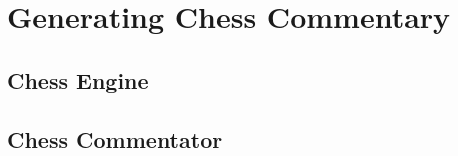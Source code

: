 \section{Generating Chess Commentary}


% 

\subsection{Chess Engine}







\subsection{Chess Commentator}





% 